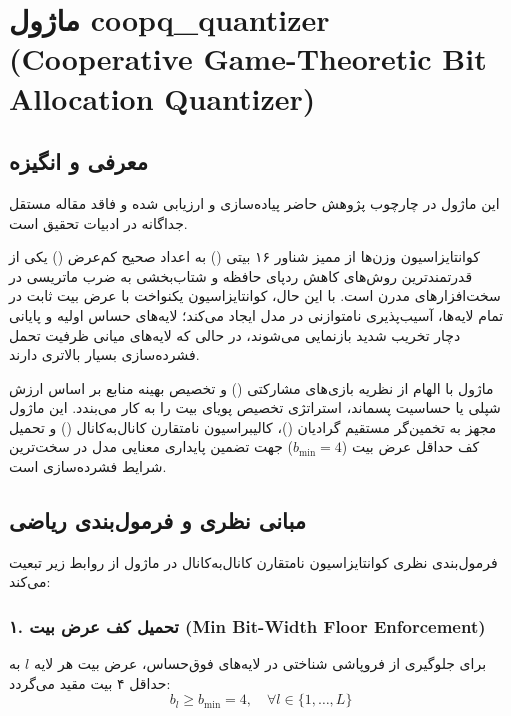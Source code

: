 \section{ماژول coopq\_quantizer (Cooperative Game-Theoretic Bit Allocation Quantizer)}
\label{sec:module_coopq_quantizer}

\subsection{معرفی و انگیزه}
این ماژول در چارچوب پژوهش حاضر پیاده‌سازی و ارزیابی شده و فاقد مقاله مستقل جداگانه در ادبیات تحقیق است.

کوانتایزاسیون وزن‌ها از ممیز شناور ۱۶ بیتی () به اعداد صحیح کم‌عرض () یکی از قدرتمندترین روش‌های کاهش ردپای حافظه و شتاب‌بخشی به ضرب ماتریسی در سخت‌افزارهای مدرن است. با این حال، کوانتایزاسیون یکنواخت با عرض بیت ثابت در تمام لایه‌ها، آسیب‌پذیری نامتوازنی در مدل ایجاد می‌کند؛ لایه‌های حساس اولیه و پایانی دچار تخریب شدید بازنمایی می‌شوند، در حالی که لایه‌های میانی ظرفیت تحمل فشرده‌سازی بسیار بالاتری دارند.

ماژول  با الهام از نظریه بازی‌های مشارکتی () و تخصیص بهینه منابع بر اساس ارزش شپلی یا حساسیت پسماند، استراتژی تخصیص پویای بیت را به کار می‌بندد. این ماژول مجهز به تخمین‌گر مستقیم گرادیان ()، کالیبراسیون نامتقارن کانال‌به‌کانال () و تحمیل کف حداقل عرض بیت ($b_{\min} = 4$) جهت تضمین پایداری معنایی مدل در سخت‌ترین شرایط فشرده‌سازی است.

\subsection{مبانی نظری و فرمول‌بندی ریاضی}
فرمول‌بندی نظری کوانتایزاسیون نامتقارن کانال‌به‌کانال در ماژول  از روابط زیر تبعیت می‌کند:

\subsubsection*{۱. تحمیل کف عرض بیت (Min Bit-Width Floor Enforcement)}
برای جلوگیری از فروپاشی شناختی در لایه‌های فوق‌حساس، عرض بیت هر لایه $l$ به حداقل ۴ بیت مقید می‌گردد:
\begin{equation}
b_l \ge b_{\min} = 4, \quad \forall l \in \{1, \dots, L\}
\end{equation}

